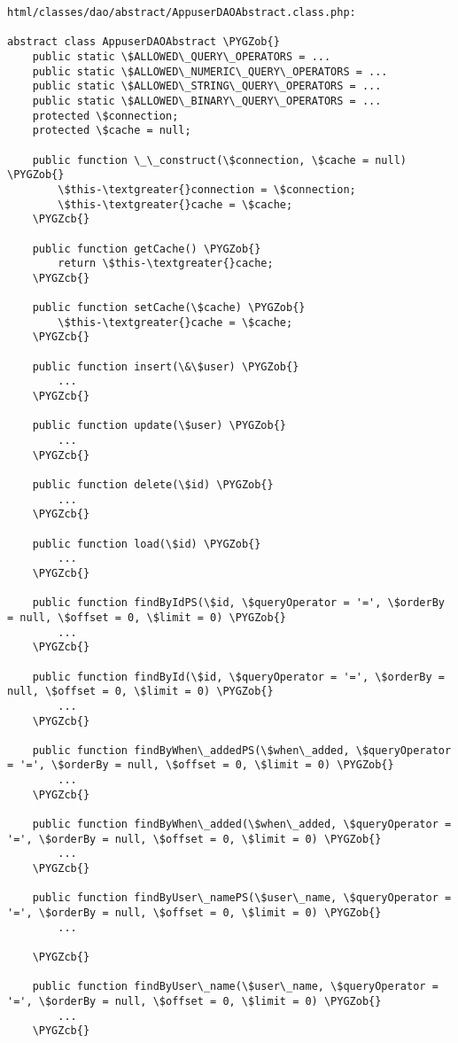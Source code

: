 \documentclass[letterpaper,10pt,english]{sphinxmanual}
\def\PYGZob{\char`\{}
\def\PYGZcb{\char`\}}
\begin{document}
\begin{Verbatim}[commandchars=\\\{\}]
html/classes/dao/abstract/AppuserDAOAbstract.class.php:

abstract class AppuserDAOAbstract \PYGZob{}
    public static \$ALLOWED\_QUERY\_OPERATORS = ...
    public static \$ALLOWED\_NUMERIC\_QUERY\_OPERATORS = ...
    public static \$ALLOWED\_STRING\_QUERY\_OPERATORS = ...
    public static \$ALLOWED\_BINARY\_QUERY\_OPERATORS = ...
    protected \$connection;
    protected \$cache = null;

    public function \_\_construct(\$connection, \$cache = null) \PYGZob{}
        \$this-\textgreater{}connection = \$connection;
        \$this-\textgreater{}cache = \$cache;
    \PYGZcb{}

    public function getCache() \PYGZob{}
        return \$this-\textgreater{}cache;
    \PYGZcb{}

    public function setCache(\$cache) \PYGZob{}
        \$this-\textgreater{}cache = \$cache;
    \PYGZcb{}

    public function insert(\&\$user) \PYGZob{}
        ...
    \PYGZcb{}

    public function update(\$user) \PYGZob{}
        ...
    \PYGZcb{}

    public function delete(\$id) \PYGZob{}
        ...
    \PYGZcb{}

    public function load(\$id) \PYGZob{}
        ...
    \PYGZcb{}

    public function findByIdPS(\$id, \$queryOperator = '=', \$orderBy = null, \$offset = 0, \$limit = 0) \PYGZob{}
        ...
    \PYGZcb{}

    public function findById(\$id, \$queryOperator = '=', \$orderBy = null, \$offset = 0, \$limit = 0) \PYGZob{}
        ...
    \PYGZcb{}

    public function findByWhen\_addedPS(\$when\_added, \$queryOperator = '=', \$orderBy = null, \$offset = 0, \$limit = 0) \PYGZob{}
        ...
    \PYGZcb{}

    public function findByWhen\_added(\$when\_added, \$queryOperator = '=', \$orderBy = null, \$offset = 0, \$limit = 0) \PYGZob{}
        ...
    \PYGZcb{}

    public function findByUser\_namePS(\$user\_name, \$queryOperator = '=', \$orderBy = null, \$offset = 0, \$limit = 0) \PYGZob{}
        ...

    \PYGZcb{}

    public function findByUser\_name(\$user\_name, \$queryOperator = '=', \$orderBy = null, \$offset = 0, \$limit = 0) \PYGZob{}
        ...
    \PYGZcb{}


\end{Verbatim}
\end{document}

